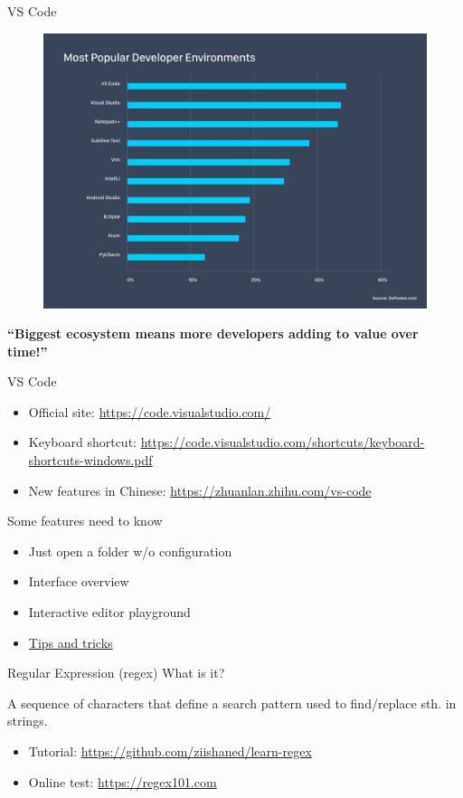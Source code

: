 \documentclass{../TexTemplate/myslide}
\begin{document}
\begin{frame}{VS Code}
\begin{figure}
\centering
\includegraphics[width=0.6\linewidth]{fig/most-popular-dev-environments.png}
\end{figure}
\textbf{``Biggest ecosystem means more developers adding to value over time!''}
\end{frame}

\begin{frame}{VS Code}
\begin{itemize}
	\item Official site: \url{https://code.visualstudio.com/}
	\item Keyboard shortcut: \url{https://code.visualstudio.com/shortcuts/keyboard-shortcuts-windows.pdf}
	\item New features in Chinese: \url{https://zhuanlan.zhihu.com/vs-code}
\end{itemize}
\end{frame}

\begin{frame}{Some features need to know}
\begin{itemize}
	\item Just open a folder w/o configuration
	\item Interface overview
	\item Interactive editor playground
	\item \href{https://code.visualstudio.com/docs/getstarted/tips-and-tricks\#vscode}{Tips and tricks}
\end{itemize}
\end{frame}

\begin{frame}{Regular Expression (regex)}
What is it?
\begin{flushleft}
A sequence of characters that define a search pattern used to find/replace sth. in strings.
\end{flushleft}
\begin{itemize}
	\item Tutorial: \url{https://github.com/ziishaned/learn-regex}
	\item Online test: \url{https://regex101.com}
\end{itemize}
\end{frame}
\end{document}
